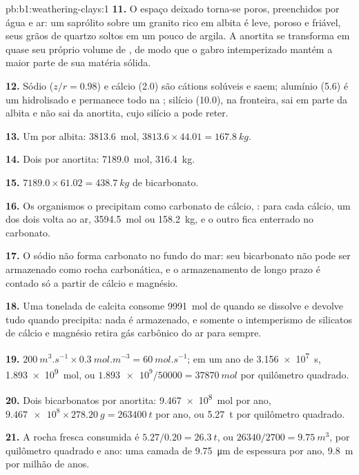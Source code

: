 \begin{solution}{pb:b1:weathering-clays:1}
\textbf{11.} O espaço deixado torna-se poros, preenchidos por água e ar: um
saprólito sobre um granito rico em albita é leve, poroso e friável, seus grãos de quartzo soltos em um pouco de argila. A anortita se transforma em quase seu próprio volume de , de modo que o gabro intemperizado mantém a maior parte de sua matéria sólida.

\textbf{12.} Sódio ($z/r = 0.98$) e cálcio (2.0) são cátions solúveis e saem; alumínio (5.6) é um hidrolisado e permanece todo na ; silício (10.0), na fronteira, sai em parte da albita e não sai da anortita, cujo silício a  pode reter.

\textbf{13.} Um  por albita: \qty{3813.6}{mol}, $3813.6 \times 44.01 =
\qty{167.8}{kg}$.

\textbf{14.} Dois por anortita: \qty{7189.0}{mol}, \qty{316.4}{kg}.

\textbf{15.} $7189.0 \times 61.02 = \qty{438.7}{kg}$ de bicarbonato.

\textbf{16.} Os organismos o precipitam como carbonato de cálcio,
: para cada cálcio, um dos dois
 volta ao ar, \qty{3594.5}{mol} ou \qty{158.2}{kg}, e o outro fica enterrado no carbonato.

\textbf{17.} O sódio não forma carbonato no fundo do mar: seu bicarbonato não pode ser armazenado como rocha carbonática, e o armazenamento de longo prazo é contado só a partir de cálcio e magnésio.

\textbf{18.} Uma tonelada de calcita consome \qty{9991}{mol} de  quando se dissolve e devolve tudo quando precipita: nada é armazenado, e somente o intemperismo de silicatos de cálcio e magnésio retira gás carbônico do ar para sempre.

\textbf{19.} $\qty{200}{m^3.s^{-1}} \times \qty{0.3}{mol.m^{-3}} =
\qty{60}{mol.s^{-1}}$; em um ano de \qty{3.156e7}{s}, \qty{1.893e9}{mol}, ou
$\num{1.893e9}/\num{50000} = \qty{37870}{mol}$ por quilômetro quadrado.

\textbf{20.} Dois bicarbonatos por anortita: \qty{9.467e8}{mol} por ano,
$\num{9.467e8}\times\qty{278.20}{g} = \qty{263400}{t}$ por ano, ou
\qty{5.27}{t} por quilômetro quadrado.

\textbf{21.} A rocha fresca consumida é $5.27/0.20 = \qty{26.3}{t}$, ou
$\num{26340}/2700 = \qty{9.75}{m^3}$, por quilômetro quadrado e ano: uma camada de
\qty{9.75}{\micro m} de espessura por ano, \qty{9.8}{m} por milhão de anos.


\end{solution}
